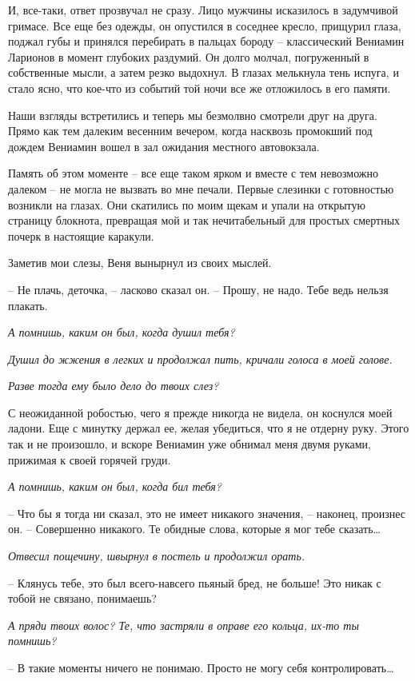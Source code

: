\documentclass[
]{book}
\begin{document}
И, все-таки, ответ прозвучал не сразу. Лицо мужчины исказилось в задумчивой гримасе. Все еще без одежды, он опустился в соседнее кресло, прищурил глаза, поджал губы и принялся перебирать в пальцах бороду -- классический Вениамин Ларионов в момент глубоких раздумий. Он долго молчал, погруженный в собственные мысли, а затем резко выдохнул. В глазах мелькнула тень испуга, и стало ясно, что кое-что из событий той ночи все же отложилось в его памяти.

Наши взгляды встретились и теперь мы безмолвно смотрели друг на друга. Прямо как тем далеким весенним вечером, когда насквозь промокший под дождем Вениамин вошел в зал ожидания местного автовокзала.

Память об этом моменте -- все еще таком ярком и вместе с тем невозможно далеком -- не могла не вызвать во мне печали. Первые слезинки с готовностью возникли на глазах. Они скатились по моим щекам и упали на открытую страницу блокнота, превращая мой и так нечитабельный для простых смертных почерк в настоящие каракули.

Заметив мои слезы, Веня вынырнул из своих мыслей.

-- Не плачь, деточка, -- ласково сказал он. -- Прошу, не надо. Тебе ведь нельзя плакать.

\emph{А помнишь, каким он был, когда душил тебя?}

\emph{Душил до жжения в легких и продолжал пить, кричали голоса в моей голове. }

\emph{Разве тогда ему было дело до твоих слез?}

С неожиданной робостью, чего я прежде никогда не видела, он коснулся моей ладони. Еще с минутку держал ее, желая убедиться, что я не отдерну руку. Этого так и не произошло, и вскоре Вениамин уже обнимал меня двумя руками, прижимая к своей горячей груди.

\emph{А помнишь, каким он был, когда бил тебя?}

-- Что бы я тогда ни сказал, это не имеет никакого значения, -- наконец, произнес он. -- Совершенно никакого. Те обидные слова, которые я мог тебе сказать\ldots{}

\emph{Отвесил пощечину, швырнул в постель и продолжил орать. }

-- Клянусь тебе, это был всего-навсего пьяный бред, не больше! Это никак с тобой не связано, понимаешь?

\emph{А пряди твоих волос? Те, что застряли в оправе его кольца, их-то ты помнишь?}

-- В такие моменты ничего не понимаю. Просто не могу себя контролировать\ldots{}
\end{document}
